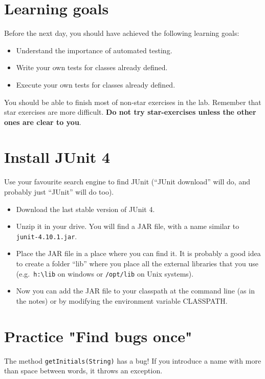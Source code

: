 \documentclass{article}
\begin{document}
\section*{Learning goals}
\label{sec:learning-goals}

Before the next day, you should have achieved the following learning
goals: 

\begin{itemize}
\item Understand the importance of automated testing. 
\item Write your own tests for classes already defined. 
\item Execute your own tests for classes already defined. 
\end{itemize}

You should be able to finish most of non-star exercises in the lab. 
Remember that star exercises are more difficult. 
\textbf{Do not try star-exercises unless the other ones are clear to
  you}.  


\section{Install JUnit 4}
\label{sec:install-junit-4}

Use your favourite search engine to find JUnit (``JUnit download''
will do, and probably just ``JUnit'' will do too). 

\begin{itemize}
\item Download the last stable version of JUnit 4.
\item Unzip it in your drive. You will find a JAR file, with a name
  similar to \verb+junit-4.10.1.jar+.
\item Place the JAR file in a place where you can find it. It is
  probably a good idea to create a folder ``lib'' where you place all
  the external libraries that you use (e.g.~\verb+h:\lib+ on windows
  or \verb+/opt/lib+ on Unix systems).
\item Now you can add the JAR file to your classpath at the command
  line (as in the notes) or by modifying the environment variable
  CLASSPATH. 
\end{itemize}

\section{Practice "Find bugs once"}
\label{sec:practice-find-bugs}

The method \verb+getInitials(String)+ has a bug! If you introduce a
name with more than space between words, it throws an exception.
\end{document}
